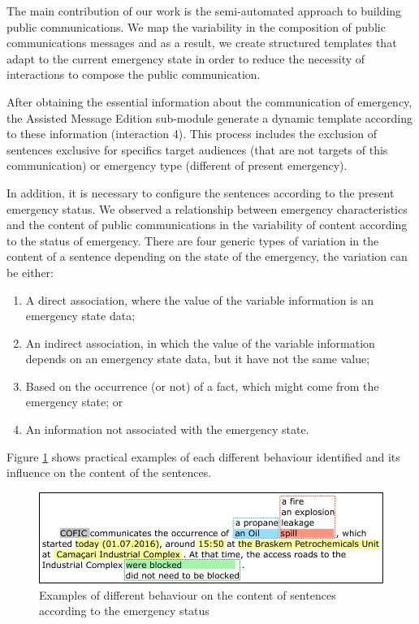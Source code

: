 The main contribution of our work is the semi-automated approach to building public communications. We map the variability in the composition of public communications messages and as a result, we create structured templates that adapt to the current emergency state in order to reduce the necessity of interactions to compose the public communication.

After obtaining the essential information about the communication of emergency, the Assisted Message Edition sub-module generate a dynamic template according to these information (interaction 4). This process includes the exclusion of sentences exclusive for specifics target audiences (that are not targets of this communication) or emergency type (different of present emergency). %

In addition, it is necessary to configure the sentences according to the present emergency status. We observed a relationship between emergency characteristics and the content of public communications in the variability of content according to the status of emergency. There are four generic types of variation in the content of a sentence depending on the state of the emergency, the variation can be either: 

\begin{enumerate}
   \item A direct association, where the value of the variable information is an emergency state data;
   \item An indirect association, in which the value of the variable information depends on an emergency state data, but it have not the same value;
   \item Based on the occurrence (or not) of a fact, which might come from the emergency state; or
   \item An information not associated with the emergency state.
\end{enumerate}

Figure \ref{fig:sentenceContext} shows practical examples of each different behaviour identified and its influence on the content of the sentences.

\begin{figure}
\centering
\includegraphics[width=0.99\linewidth]{images/sentenceContext.png}
\caption{Examples of different behaviour on the content of sentences according to the emergency status}
\label{fig:sentenceContext}
\end{figure}

